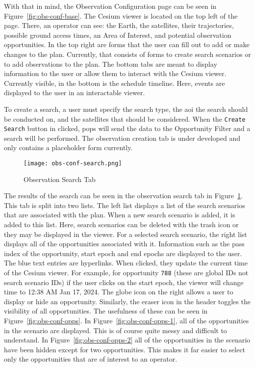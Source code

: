 With that in mind, the Observation Configuration page can be seen in
Figure~\ref{fig:obs-conf-base}. The Cesium viewer is located on the top left of
the page.  There, an operator can see: the Earth, the satellites, their
trajectories, possible ground access times, an Area of Interest, and potential
observation opportunities. In the top right are forms that the user can fill
out to add or make changes to the plan. Currently, that consists of forms to
create search scenarios or to add observations to the plan. The bottom tabs are
meant to display information to the user or allow them to interact with the
Cesium viewer. Currently visible, in the bottom is the schedule timeline.
Here, events are displayed to the user in an interactable viewer.

To create a search, a user must specify the search type, the \gls{aoi} the
search should be conducted on, and the  satellites that should be considered.
When the \texttt{Create Search} button in clicked, \gls{pops} will send the
data to the Opportunity Filter and a search will be performed. The observation
creation tab is under developed and only contains a placeholder form currently.

\begin{figure}
    \centering
    \texttt{[image: obs-conf-search.png]} 
    \caption{Observation Search Tab}
    \label{fig:obs-conf-search} 
\end{figure}

The results of the search can be seen in the observation search tab in
Figure~\ref{fig:obs-conf-search}. This tab is split into two lists. The left
list displays a list of the search scenarios that are associated with the plan.
When a new search scenario is added, it is added to this list. Here, search
scenarios can be deleted with the trash icon or they may be displayed in the
viewer. For a selected search scenario, the right list displays all of the
opportunities associated with it. Information such as the pass index of the
opportunity, start epoch and end epochs are displayed to the user. The blue
text entries are hyperlinks. When clicked, they update the current time of the
Cesium viewer. For example, for opportunity \texttt{788} (these are global IDs
not search scenario IDs) if the user clicks on the start epoch, the viewer will
change time to 12:38 AM Jan 17, 2024. The globe icon on the right allows a user
to display or hide an opportunity. Similarly, the eraser icon in the header
toggles the visibility of all opportunities.  The usefulness of these can be
seen in Figure~\ref{fig:obs-conf-opps}.  In Figure~\ref{fig:obs-conf-opps-1},
all of the opportunities in the scenario are displayed. This is of course quite
messy and difficult to understand. In Figure~\ref{fig:obs-conf-opps-2} all of
the opportunities in the scenario have been hidden except for two
opportunities. This makes it far easier to select only the opportunities that
are of interest to an operator.


